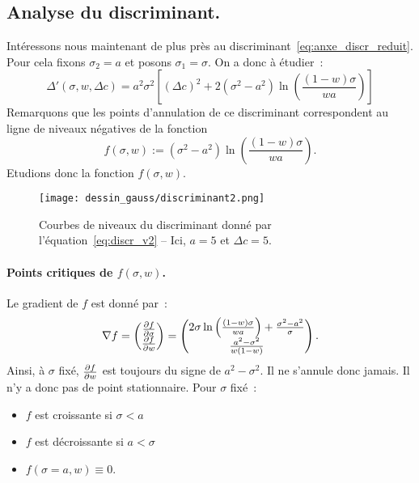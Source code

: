 \documentclass[main.tex]{subfiles}
\begin{document}
\subsection*{Analyse du discriminant.}
Intéressons nous maintenant de plus près au discriminant~\eqref{eq:anxe_discr_reduit}. Pour cela fixons $\sigma_2=a$ et posons $\sigma_1=\sigma$. On a donc à étudier~:
\begin{equation}\label{eq:discr_v2}
\Delta'(\sigma,w,\Delta c) = a^2 \sigma^2 \left[ (\Delta c)^2 + 2(\sigma^2-a^2)\ln\left( \frac{(1-w)\sigma}{wa} \right) \right]
\end{equation}
Remarquons que les points d'annulation de ce discriminant correspondent au ligne de niveaux négatives de la fonction
$$f( \sigma,w ) := (\sigma^2-a^2)\ln\left( \frac{(1-w)\sigma}{wa} \right). $$
Etudions donc la fonction $f( \sigma,w )$.

\begin{figure}
\centering
\texttt{[image: dessin\_gauss/discriminant2.png]}
\vspace{-5mm}
\caption{\label{fig:courbe_nvx_discrim}Courbes de niveaux du discriminant donné par l'équation~\eqref{eq:discr_v2} -- Ici, $a=5$ et $\Delta c=5$.}
\end{figure}
\paragraph{Points critiques de $f( \sigma,w )$.}
Le gradient de $f$ est donné par~:
\begin{equation}
\nabla f = \begin{pmatrix}
\frac{\partial f}{\partial \sigma} \\ \frac{\partial f}{\partial w}
\end{pmatrix}=\begin{pmatrix}
2\sigma \ln\left( \frac{(1-w)\sigma}{wa} \right) + \frac{\sigma^2-a^2}{\sigma}\\ \frac{a^2-\sigma^2}{w(1-w)}
\end{pmatrix}.
\end{equation}
Ainsi, à $\sigma$ fixé, $\frac{\partial f}{\partial w}$ est toujours du signe de $a^2-\sigma^2$. Il ne s'annule donc jamais. Il n'y a donc pas de point stationnaire. Pour $\sigma$ fixé~:
\begin{itemize}
\item $f$ est croissante si $\sigma < a$
\item $f$ est décroissante si $a<\sigma$
\item $f(\sigma=a, w) \equiv 0$.
\end{itemize}
\end{document}
